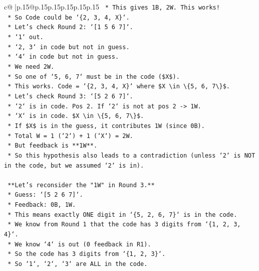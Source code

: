 \documentclass{article}
\begin{document}
{\begin{supertabular}{c@{$\;$}|p{.15\linewidth}@{}p{.15\linewidth}p{.15\linewidth}p{.15\linewidth}p{.15\linewidth}p{.15\linewidth}}
{{{\texttt{            *   This gives 1B, 2W. This works!} \\
\texttt{            *   So Code could be `\{2, 3, 4, X\}`.} \\
\texttt{    *   Let's check Round 2: `{[}1 5 6 7{]}`.} \\
\texttt{        *   `1` out.} \\
\texttt{        *   `2, 3` in code but not in guess.} \\
\texttt{        *   `4` in code but not in guess.} \\
\texttt{        *   We need 2W.} \\
\texttt{        *   So one of `5, 6, 7` must be in the code (\$X\$).} \\
\texttt{        *   This works. Code = `\{2, 3, 4, X\}` where \$X \textbackslash{}in \textbackslash{}\{5, 6, 7\textbackslash{}\}\$.} \\
\texttt{    *   Let's check Round 3: `{[}5 2 6 7{]}`.} \\
\texttt{        *   `2` is in code. Pos 2. If `2` is not at pos 2 {-}> 1W.} \\
\texttt{        *   `X` is in code. \$X \textbackslash{}in \textbackslash{}\{5, 6, 7\textbackslash{}\}\$.} \\
\texttt{        *   If \$X\$ is in the guess, it contributes 1W (since 0B).} \\
\texttt{        *   Total W = 1 (`2`) + 1 (`X`) = 2W.} \\
\texttt{        *   But feedback is **1W**.} \\
\texttt{        *   So this hypothesis also leads to a contradiction (unless `2` is NOT in the code, but we assumed `2` is in).} \\
\\ 
\texttt{    **Let's reconsider the "1W" in Round 3.**} \\
\texttt{    *   Guess: `{[}5 2 6 7{]}`.} \\
\texttt{    *   Feedback: 0B, 1W.} \\
\texttt{    *   This means exactly ONE digit in `\{5, 2, 6, 7\}` is in the code.} \\
\texttt{    *   We know from Round 1 that the code has 3 digits from `\{1, 2, 3, 4\}`.} \\
\texttt{    *   We know `4` is out (0 feedback in R1).} \\
\texttt{    *   So the code has 3 digits from `\{1, 2, 3\}`.} \\
\texttt{    *   So `1`, `2`, `3` are ALL in the code.} \\
}}}
\end{supertabular}}
\end{document}

